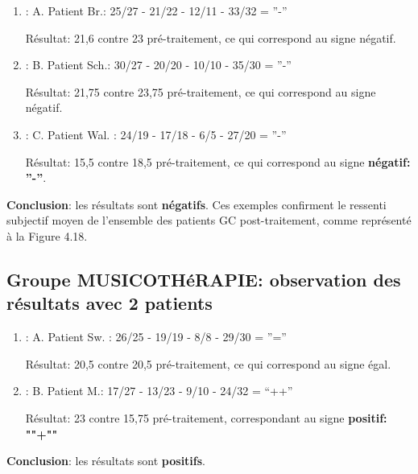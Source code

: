 \begin{enumerate}
\item : A. Patient Br.:  25/27 - 21/22 - 12/11 - 33/32 =  ''-''

          Résultat: 21,6 contre 23 pré-traitement,  ce qui
        correspond au signe négatif.
      \item : B. Patient Sch.: 30/27 - 20/20 -  10/10 - 35/30 = ''-''

         Résultat: 21,75 contre 23,75 pré-traitement, ce qui
        correspond au signe négatif.

 		\item :  C. Patient Wal. : 24/19 -  17/18 - 6/5 -
                  27/20 =  ''-''

                  Résultat: 15,5 contre 18,5 pré-traitement, ce qui
        correspond au signe \textbf{négatif: ''-''}.
 	\end{enumerate}


       \textbf{ Conclusion}: les résultats sont \textbf{négatifs}.
        Ces exemples confirment
        le ressenti subjectif moyen de l'ensemble des patients
        GC post-traitement, comme représenté à la Figure 4.18.
        \subsection{Groupe MUSICOTHéRAPIE: observation des résultats avec 2 patients}


\begin{enumerate}
 		\item : A. Patient Sw. : 26/25 - 19/19 - 8/8 - 29/30 =  ''=''



  Résultat: 20,5 contre 20,5 pré-traitement, ce qui
        correspond au signe égal.



 		\item : B. Patient M.: 17/27 - 13/23 -  9/10 - 24/32 = ``++''

              Résultat: 23 contre 15,75 pré-traitement, correspondant
              au signe \textbf{positif: ""+""}
            \end{enumerate}
 \textbf{ Conclusion}: les résultats sont \textbf{positifs}.


